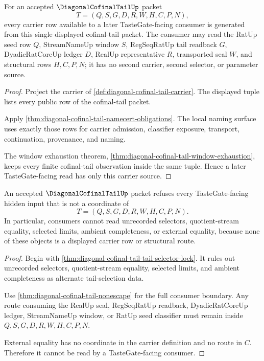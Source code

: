 \begin{theorem}
\label{thm:diagonal-cofinal-tail-tastegate-carrier-single-source}
For an accepted $\DiagonalCofinalTailUp$ packet
$$
T=(Q,S,G,D,R,W,H,C,P,N),
$$
every carrier row available to a later TasteGate-facing consumer is generated from this single displayed cofinal-tail packet. The consumer may read the RatUp seed row $Q$, StreamNameUp window $S$, RegSeqRatUp tail readback $G$, DyadicRatCoreUp ledger $D$, RealUp representative $R$, transported seal $W$, and structural rows $H,C,P,N$; it has no second carrier, second selector, or parameter source.
\end{theorem}
\begin{proof}
Project the carrier of \autoref{def:diagonal-cofinal-tail-carrier}. The displayed tuple lists every public row of the cofinal-tail packet.

Apply \autoref{thm:diagonal-cofinal-tail-namecert-obligations}. The local naming surface uses exactly those rows for carrier admission, classifier exposure, transport, continuation, provenance, and naming.

The window exhaustion theorem, \autoref{thm:diagonal-cofinal-tail-window-exhaustion}, keeps every finite cofinal-tail observation inside the same tuple. Hence a later TasteGate-facing read has only this carrier source.
\end{proof}

\begin{theorem}
\label{thm:diagonal-cofinal-tail-tastegate-hidden-input-refusal}
An accepted $\DiagonalCofinalTailUp$ packet refuses every TasteGate-facing hidden input that is not a coordinate of
$$
T=(Q,S,G,D,R,W,H,C,P,N).
$$
In particular, consumers cannot read unrecorded selectors, quotient-stream equality, selected limits, ambient completeness, or external equality, because none of these objects is a displayed carrier row or structural route.
\end{theorem}
\begin{proof}
Begin with \autoref{thm:diagonal-cofinal-tail-tail-selector-lock}. It rules out unrecorded selectors, quotient-stream equality, selected limits, and ambient completeness as alternate tail-selection data.

Use \autoref{thm:diagonal-cofinal-tail-nonescape} for the full consumer boundary. Any route consuming the RealUp seal, RegSeqRatUp readback, DyadicRatCoreUp ledger, StreamNameUp window, or RatUp seed classifier must remain inside $Q,S,G,D,R,W,H,C,P,N$.

External equality has no coordinate in the carrier definition and no route in $C$. Therefore it cannot be read by a TasteGate-facing consumer.
\end{proof}

